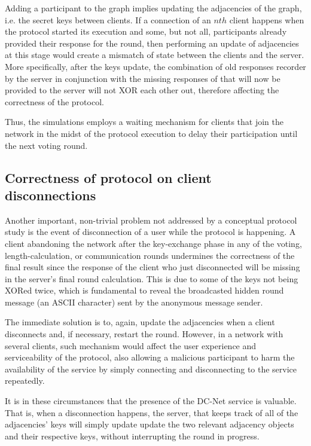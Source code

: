 Adding a participant to the graph implies updating the adjacencies of the graph, i.e. the secret keys between clients. If a connection of an $nth$ client happens when the protocol started its execution and some, but not all, participants already provided their response for the round, then performing an update of adjacencies at this stage would create a mismatch of state between the clients and the server. More specifically, after the keys update, the combination of old responses recorder by the server in conjunction with the missing responses of that will now be provided to the server will not XOR each other out, therefore affecting the correctness of the protocol.

Thus, the simulations employs a waiting mechanism for clients that join the network in the midst of the protocol execution to delay their participation until the next voting round.

\subsection{Correctness of protocol on client disconnections}
Another important, non-trivial problem not addressed by a conceptual protocol study is the event of disconnection of a user while the protocol is happening. A client abandoning the network after the key-exchange phase in any of the voting, length-calculation, or communication rounds undermines the correctness of the final result since the response of the client who just disconnected will be missing in the server's final round calculation. This is due to some of the keys not being XORed twice, which is fundamental to reveal the broadcasted hidden round message (an ASCII character) sent by the anonymous message sender.

The immediate solution is to, again, update the adjacencies when a client disconnects and, if necessary, restart the round. However, in a network with several clients, such mechanism would affect the user experience and serviceability of the protocol, also allowing a malicious participant to harm the availability of the service by simply connecting and disconnecting to the service repeatedly.

It is in these circumstances that the presence of the DC-Net service is valuable. That is, when a disconnection happens, the server, that keeps track of all of the adjacencies' keys will simply update update the two relevant adjacency objects and their respective keys, without interrupting the round in progress.


